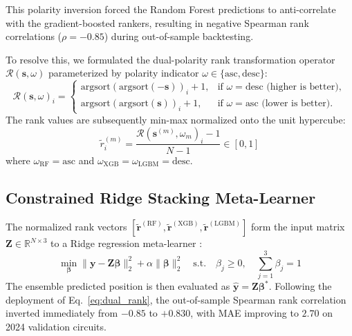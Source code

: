 This polarity inversion forced the Random Forest predictions to anti-correlate with the gradient-boosted rankers, resulting in negative Spearman rank correlations ($\rho = -0.85$) during out-of-sample backtesting.

To resolve this, we formulated the dual-polarity rank transformation operator $\mathcal{R}(\mathbf{s}, \omega)$ parameterized by polarity indicator $\omega \in \{\text{asc}, \text{desc}\}$:
\begin{equation}
\mathcal{R}(\mathbf{s}, \omega)_i = \begin{cases}
\text{argsort}\left( \text{argsort}(-\mathbf{s}) \right)_i + 1, & \text{if } \omega = \text{desc (higher is better)}, \\
\text{argsort}\left( \text{argsort}(\mathbf{s}) \right)_i + 1, & \text{if } \omega = \text{asc (lower is better)}.
\end{cases}
\label{eq:dual_rank}
\end{equation}
The rank values are subsequently min-max normalized onto the unit hypercube:
\begin{equation}
\tilde{r}_i^{(m)} = \frac{\mathcal{R}(\mathbf{s}^{(m)}, \omega_m)_i - 1}{N - 1} \in [0, 1]
\label{eq:normalized_rank}
\end{equation}
where $\omega_{\text{RF}} = \text{asc}$ and $\omega_{\text{XGB}} = \omega_{\text{LGBM}} = \text{desc}$.

\subsection{Constrained Ridge Stacking Meta-Learner}
The normalized rank vectors $[\tilde{\mathbf{r}}^{(\text{RF})}, \tilde{\mathbf{r}}^{(\text{XGB})}, \tilde{\mathbf{r}}^{(\text{LGBM})}]$ form the input matrix $\mathbf{Z} \in \mathbb{R}^{N \times 3}$ to a Ridge regression meta-learner \cite{wolpert1992stacked}:
\begin{equation}
\min_{\boldsymbol{\beta}} \|\mathbf{y} - \mathbf{Z}\boldsymbol{\beta}\|_2^2 + \alpha \|\boldsymbol{\beta}\|_2^2 \quad \text{s.t.} \quad \beta_j \ge 0, \quad \sum_{j=1}^3 \beta_j = 1
\label{eq:ridge_meta}
\end{equation}
The ensemble predicted position is then evaluated as $\hat{\mathbf{y}} = \mathbf{Z}\boldsymbol{\beta}^*$. Following the deployment of Eq.~\eqref{eq:dual_rank}, the out-of-sample Spearman rank correlation inverted immediately from $-0.85$ to $+0.830$, with MAE improving to $2.70$ on 2024 validation circuits.
